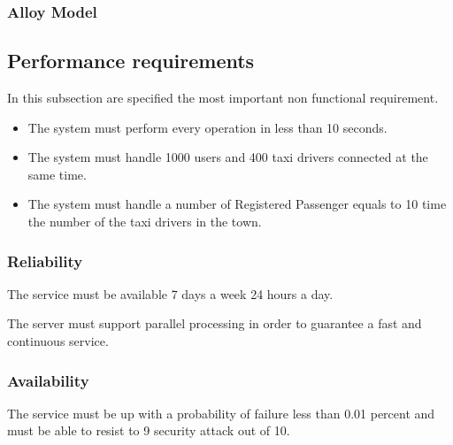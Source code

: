 \subsubsection{Alloy Model}
\begin{itemize}
	\newpage
	\newpage
	\newpage
	\newpage
	\newpage
	\newpage
\end{itemize}
\subsection{Performance requirements}
In this subsection are specified the most important non functional requirement.\par
\begin{itemize}
	\item The system must perform every operation in less than 10 seconds.
	\item The system must handle 1000 users and 400 taxi drivers connected at the same time.
	\item The system must handle a number of Registered Passenger equals to 10 time the number of the taxi drivers in the town.
\end{itemize}
\subsubsection{Reliability}
The service must be available 7 days a week 24 hours a day. \par The server must support parallel processing in order to guarantee a fast and continuous service.
\subsubsection{Availability}
The service must be up with a probability of failure less than 0.01 percent and must be able to resist to 9 security attack out of 10.
